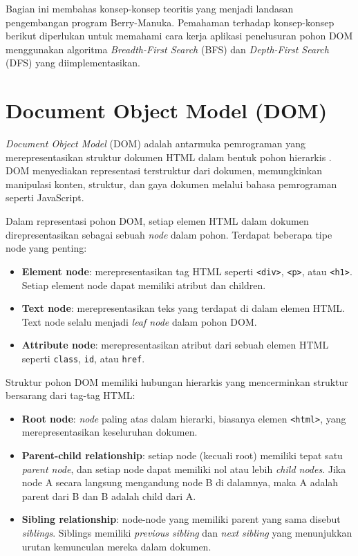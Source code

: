 Bagian ini membahas konsep-konsep teoritis yang menjadi landasan pengembangan
program Berry-Manuka. Pemahaman terhadap konsep-konsep berikut diperlukan untuk
memahami cara kerja aplikasi penelusuran pohon DOM menggunakan algoritma
\textit{Breadth-First Search} (BFS) dan \textit{Depth-First Search} (DFS) yang
diimplementasikan.

\section{Document Object Model (DOM)}

\textit{Document Object Model} (DOM) adalah antarmuka pemrograman yang
merepresentasikan struktur dokumen HTML dalam bentuk pohon hierarkis
\cite{mdn_dom}. DOM menyediakan representasi terstruktur dari dokumen, memungkinkan
manipulasi konten, struktur, dan gaya dokumen melalui bahasa pemrograman seperti
JavaScript.

Dalam representasi pohon DOM, setiap elemen HTML dalam dokumen direpresentasikan
sebagai sebuah \textit{node} dalam pohon. Terdapat beberapa tipe node yang
penting:

\begin{itemize}
    \item \textbf{Element node}: merepresentasikan tag HTML seperti \texttt{<div>},
    \texttt{<p>}, atau \texttt{<h1>}. Setiap element node dapat memiliki atribut
    dan children.
    
    \item \textbf{Text node}: merepresentasikan teks yang terdapat di dalam elemen
    HTML. Text node selalu menjadi \textit{leaf node} dalam pohon DOM.
    
    \item \textbf{Attribute node}: merepresentasikan atribut dari sebuah elemen
    HTML seperti \texttt{class}, \texttt{id}, atau \texttt{href}.
\end{itemize}

Struktur pohon DOM memiliki hubungan hierarkis yang mencerminkan struktur
bersarang dari tag-tag HTML:

\begin{itemize}
    \item \textbf{Root node}: \textit{node} paling atas dalam hierarki, biasanya
    elemen \texttt{<html>}, yang merepresentasikan keseluruhan dokumen.
    
    \item \textbf{Parent-child relationship}: setiap node (kecuali root) memiliki
    tepat satu \textit{parent node}, dan setiap node dapat memiliki nol atau
    lebih \textit{child nodes}. Jika node A secara langsung mengandung node B di
    dalamnya, maka A adalah parent dari B dan B adalah child dari A.
    
    \item \textbf{Sibling relationship}: node-node yang memiliki parent yang sama
    disebut \textit{siblings}. Siblings memiliki \textit{previous sibling} dan
    \textit{next sibling} yang menunjukkan urutan kemunculan mereka dalam dokumen.
\end{itemize}

